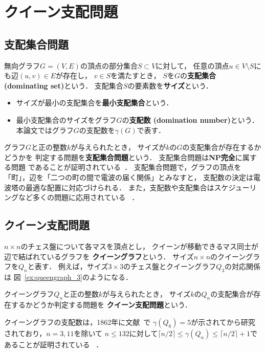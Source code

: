 \chapter{クイーン支配問題}\label{chap:background}

\section{支配集合問題}
無向グラフ$G=(V,E)$の頂点の部分集合$S\subset V$に対して，
任意の頂点$u \in V\setminus S$にも辺$(u,v) \in E$が存在し，
$v \in S$を満たすとき，
$S$を$G$の\textbf{支配集合 (dominating set)}という．
支配集合$S$の要素数を\textbf{サイズ}という．
 \begin{itemize}
  \item サイズが最小の支配集合を\textbf{最小支配集合}という．
  \item 最小支配集合のサイズをグラフ$G$の\textbf{支配数 (domination number)}という．
    本論文ではグラフ$G$の支配数を$\gamma(G)$で表す．
 \end{itemize}

グラフ$G$と正の整数$k$が与えられたとき，
サイズが$k$の$G$の支配集合が存在するかどうかを
判定する問題を\textbf{支配集合問題}という．
支配集合問題は\textbf{NP完全}に属する問題
であることが証明されている~\cite{Jhonson79}．
支配集合問題で，グラフの頂点を「町」，辺を「二つの町の間で電波の届く関係」とみなすと，
支配数の決定は電波塔の最適な配置に対応づけられる．
また，支配数や支配集合はスケジューリングなど多くの問題に応用されている
~\cite{Haynes98,Haynes98Advanced}．

\section{クイーン支配問題}
$n\times n$のチェス盤について各マスを頂点とし，
クイーンが移動できるマス同士が辺で結ばれているグラフを
\textbf{クイーングラフ}という．
サイズ$n\times n$のクイーングラフを$Q_n$と表す．
例えば，サイズ$3 \times 3$のチェス盤とクイーングラフ$Q_3$の対応関係は
図~\ref{ex:queengraph_3}のようになる．

クイーングラフ$Q_n$と正の整数$k$が与えられたとき，
サイズ$k$の$Q_n$の支配集合が存在するかどうか判定する問題を
\textbf{クイーン支配問題}という． \par
クイーングラフの支配数は，1862年に文献~\cite{Jaenisch62}で
$\gamma(Q_8)=5$が示されてから研究されており，$n=3,11$を除いて
$n \leq 132$に対して$\lceil n/2 \rceil \leq \gamma(Q_n) 
\leq \lceil n/2 \rceil +1 $であることが証明されている
~\cite{Ostergard01}．

